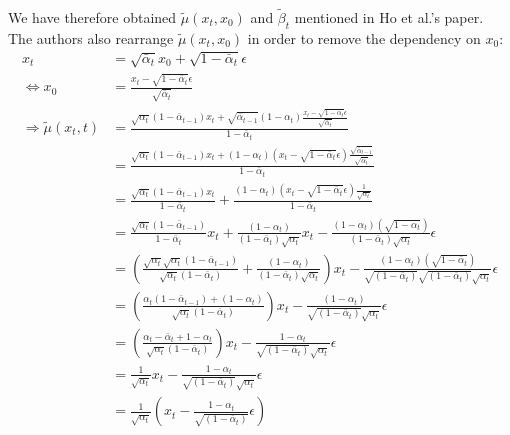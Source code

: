 \documentclass{article}
\begin{document}
{
\allowdisplaybreaks \\
We have therefore obtained $\tilde{\mu}(x_t, x_0)$ and $\tilde{\beta}_t$ mentioned in Ho et al.'s \cite{ho2020denoising} paper. \\
The authors also rearrange $\tilde{\mu}(x_t, x_0)$ in order to remove the dependency on $x_0$: \\
  \begin{align}
    x_t &= \sqrt{\bar{\alpha}_t} x_0 + \sqrt{1 - \bar{\alpha}_t} \epsilon \\
    \Leftrightarrow x_0 &= \frac{x_t - \sqrt{1 - \bar{\alpha}_t} \epsilon}{\sqrt{\bar{\alpha}_t}} \\
    \Rightarrow \tilde{\mu}(x_t, t) &= \frac{\sqrt{\alpha_t}(1 - \bar{\alpha}_{t-1}) x_t + \sqrt{\bar{\alpha}_{t-1}}(1 - \alpha_t) \frac{x_t - \sqrt{1 - \bar{\alpha}_t} \epsilon}{\sqrt{\bar{\alpha}_t}}}{1 - \bar{\alpha}_t} \\
    &= \frac{\sqrt{\alpha_t}(1 - \bar{\alpha}_{t-1}) x_t + (1 - \alpha_t) \left(x_t - \sqrt{1 - \bar{\alpha}_t} \epsilon \right) \frac{\sqrt{\bar{\alpha}_{t-1}}}{\sqrt{\bar{\alpha}_t}}}{1 - \bar{\alpha}_t} \\
    &= \frac{\sqrt{\alpha_t}(1 - \bar{\alpha}_{t-1}) x_t}{{1 - \bar{\alpha}_t}} + \frac{(1 - \alpha_t) \left(x_t - \sqrt{1 - \bar{\alpha}_t} \epsilon \right) \frac{1}{\sqrt{\alpha_t}}}{1 - \bar{\alpha}_t} \\
    &= \frac{\sqrt{\alpha_t}(1 - \bar{\alpha}_{t-1})}{{1 - \bar{\alpha}_t}} x_t + \frac{(1 - \alpha_t)}{(1 - \bar{\alpha}_t) \sqrt{\alpha_t}} x_t - \frac{(1 - \alpha_t)(\sqrt{1 - \bar{\alpha}_t})}{(1 - \bar{\alpha}_t)\sqrt{\alpha_t}} \epsilon \\
    &= \left( \frac{\sqrt{\alpha_t} \sqrt{\alpha_t}(1 - \bar{\alpha}_{t-1})}{\sqrt{\alpha_t} ({1 - \bar{\alpha}_t})}+ \frac{(1 - \alpha_t)}{(1 - \bar{\alpha}_t) \sqrt{\alpha_t}} \right) x_t - \frac{(1 - \alpha_t)(\sqrt{1 - \bar{\alpha}_t})}{\sqrt{(1 - \bar{\alpha}_t)}\sqrt{(1 - \bar{\alpha}_t)}\sqrt{\alpha_t}} \epsilon \\
    &= \left( \frac{\alpha_t (1 - \bar{\alpha}_{t-1}) + (1 - \alpha_t)}{\sqrt{\alpha_t} ({1 - \bar{\alpha}_t})} \right) x_t - \frac{(1 - \alpha_t)}{\sqrt{(1 - \bar{\alpha}_t)}\sqrt{\alpha_t}} \epsilon \\
    &= \left( \frac{\alpha_t - \bar{\alpha}_{t} + 1 - \alpha_t}{\sqrt{\alpha_t} ({1 - \bar{\alpha}_t})} \right) x_t - \frac{1 - \alpha_t}{\sqrt{(1 - \bar{\alpha}_t)}\sqrt{\alpha_t}} \epsilon \\
    &= \frac{1}{\sqrt{\alpha_t}} x_t - \frac{1 - \alpha_t}{\sqrt{(1 - \bar{\alpha}_t)}\sqrt{\alpha_t}} \epsilon \\
    &= \frac{1}{\sqrt{\alpha_t}} \left( x_t - \frac{1 - \alpha_t}{\sqrt{(1 - \bar{\alpha}_t)}} \epsilon \right)
  \end{align}
}
\end{document}
